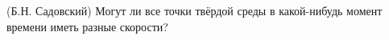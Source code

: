 (Б.Н. Садовский)
Могут ли все точки твёрдой среды в какой-нибудь момент времени иметь
разные скорости?
